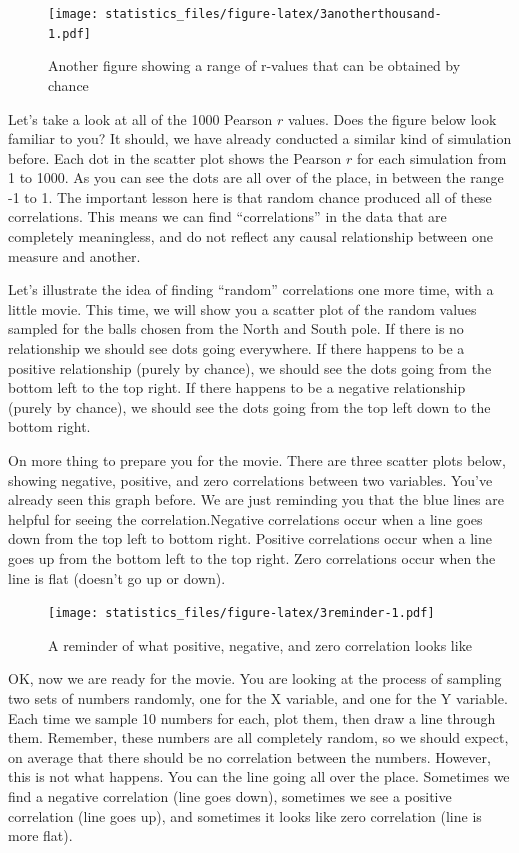 \documentclass[]{book}
\begin{document}
\begin{figure}
\centering
\texttt{[image: statistics\_files/figure-latex/3anotherthousand-1.pdf]}
\caption{\label{fig:3anotherthousand}Another figure showing a range of r-values that can be obtained by chance}
\end{figure}

Let's take a look at all of the 1000 Pearson \(r\) values. Does the figure below look familiar to you? It should, we have already conducted a similar kind of simulation before. Each dot in the scatter plot shows the Pearson \(r\) for each simulation from 1 to 1000. As you can see the dots are all over of the place, in between the range -1 to 1. The important lesson here is that random chance produced all of these correlations. This means we can find ``correlations'' in the data that are completely meaningless, and do not reflect any causal relationship between one measure and another.

Let's illustrate the idea of finding ``random'' correlations one more time, with a little movie. This time, we will show you a scatter plot of the random values sampled for the balls chosen from the North and South pole. If there is no relationship we should see dots going everywhere. If there happens to be a positive relationship (purely by chance), we should see the dots going from the bottom left to the top right. If there happens to be a negative relationship (purely by chance), we should see the dots going from the top left down to the bottom right.

On more thing to prepare you for the movie. There are three scatter plots below, showing negative, positive, and zero correlations between two variables. You've already seen this graph before. We are just reminding you that the blue lines are helpful for seeing the correlation.Negative correlations occur when a line goes down from the top left to bottom right. Positive correlations occur when a line goes up from the bottom left to the top right. Zero correlations occur when the line is flat (doesn't go up or down).

\begin{figure}
\centering
\texttt{[image: statistics\_files/figure-latex/3reminder-1.pdf]}
\caption{\label{fig:3reminder}A reminder of what positive, negative, and zero correlation looks like}
\end{figure}

OK, now we are ready for the movie. You are looking at the process of sampling two sets of numbers randomly, one for the X variable, and one for the Y variable. Each time we sample 10 numbers for each, plot them, then draw a line through them. Remember, these numbers are all completely random, so we should expect, on average that there should be no correlation between the numbers. However, this is not what happens. You can the line going all over the place. Sometimes we find a negative correlation (line goes down), sometimes we see a positive correlation (line goes up), and sometimes it looks like zero correlation (line is more flat).
\end{document}

